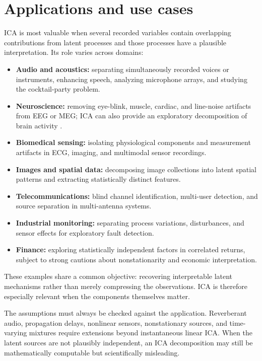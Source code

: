 \documentclass[
    paper=a4,
    fontsize=11pt,
    DIV=11,
    parskip=half,
    headings=normal,
    numbers=noendperiod,
    abstract=true,
    titlepage=true
]{scrartcl}
\begin{document}
\section{Applications and use cases}

ICA is most valuable when several recorded variables contain overlapping contributions from latent processes and those processes have a plausible interpretation. Its role varies across domains:
\begin{itemize}
    \item \textbf{Audio and acoustics:} separating simultaneously recorded voices or instruments, enhancing speech, analyzing microphone arrays, and studying the cocktail-party problem.
    \item \textbf{Neuroscience:} removing eye-blink, muscle, cardiac, and line-noise artifacts from EEG or MEG; ICA can also provide an exploratory decomposition of brain activity \cite{makeig1996}.
    \item \textbf{Biomedical sensing:} isolating physiological components and measurement artifacts in ECG, imaging, and multimodal sensor recordings.
    \item \textbf{Images and spatial data:} decomposing image collections into latent spatial patterns and extracting statistically distinct features.
    \item \textbf{Telecommunications:} blind channel identification, multi-user detection, and source separation in multi-antenna systems.
    \item \textbf{Industrial monitoring:} separating process variations, disturbances, and sensor effects for exploratory fault detection.
    \item \textbf{Finance:} exploring statistically independent factors in correlated returns, subject to strong cautions about nonstationarity and economic interpretation.
\end{itemize}

These examples share a common objective: recovering interpretable latent mechanisms rather than merely compressing the observations. ICA is therefore especially relevant when the components themselves matter.

The assumptions must always be checked against the application. Reverberant audio, propagation delays, nonlinear sensors, nonstationary sources, and time-varying mixtures require extensions beyond instantaneous linear ICA. When the latent sources are not plausibly independent, an ICA decomposition may still be mathematically computable but scientifically misleading.
\end{document}
